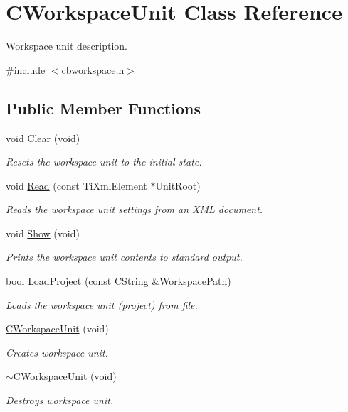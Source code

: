 \hypertarget{classCWorkspaceUnit}{\section{C\-Workspace\-Unit Class Reference}
\label{classCWorkspaceUnit}
}


Workspace unit description.  




{\ttfamily \#include $<$cbworkspace.\-h$>$}

\subsection*{Public Member Functions}
\begin{DoxyCompactItemize}
\item 
void \hyperlink{classCWorkspaceUnit_a686ef0c6dfac33827cc6b971e78b8cbd}{Clear} (void)
\begin{DoxyCompactList}\small\item\em Resets the workspace unit to the initial state. \end{DoxyCompactList}\item 
void \hyperlink{classCWorkspaceUnit_a3e379f9772bdac8445b950a105687a6b}{Read} (const Ti\-Xml\-Element $\ast$Unit\-Root)
\begin{DoxyCompactList}\small\item\em Reads the workspace unit settings from an X\-M\-L document. \end{DoxyCompactList}\item 
void \hyperlink{classCWorkspaceUnit_a06d7939e505f8b9200474b6da03339c6}{Show} (void)
\begin{DoxyCompactList}\small\item\em Prints the workspace unit contents to standard output. \end{DoxyCompactList}\item 
bool \hyperlink{classCWorkspaceUnit_a497ddf121815312350dda067c2072595}{Load\-Project} (const \hyperlink{classCString}{C\-String} \&Workspace\-Path)
\begin{DoxyCompactList}\small\item\em Loads the workspace unit (project) from file. \end{DoxyCompactList}\item 
\hyperlink{classCWorkspaceUnit_a43606fefd429de9e688d4ad8c459e2d7}{C\-Workspace\-Unit} (void)
\begin{DoxyCompactList}\small\item\em Creates workspace unit. \end{DoxyCompactList}\item 
\hyperlink{classCWorkspaceUnit_a301fd79216253991e9207e9d167185aa}{$\sim$\-C\-Workspace\-Unit} (void)
\begin{DoxyCompactList}\small\item\em Destroys workspace unit. \end{DoxyCompactList}\end{DoxyCompactItemize}

